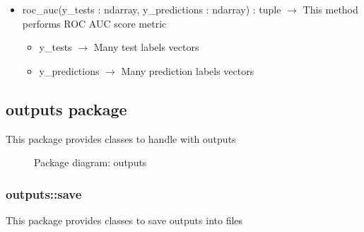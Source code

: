 \begin{description}
\begin{itemize}
\item roc\_auc(y\_tests : ndarray, y\_predictions : ndarray) : tuple $\rightarrow$ This method performs ROC AUC score metric\begin{itemize}
\item y\_tests $\rightarrow$ Many test labels vectors
\item y\_predictions $\rightarrow$ Many prediction labels vectors
\end{itemize}

\end{itemize}

\end{description}
\subsection{outputs package}
This package provides classes to handle with outputs

\begin{figure}[h]
	\centering
	\caption{Package diagram: outputs}
\end{figure}

\subsubsection{outputs::save}
This package provides classes to save outputs into files

\hypertarget{outputs::save::Save}{}
